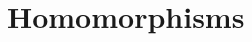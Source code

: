 \documentclass[preprint]{sigplanconf}
\begin{document}
%
%
%

\section{Homomorphisms}
\end{document}
